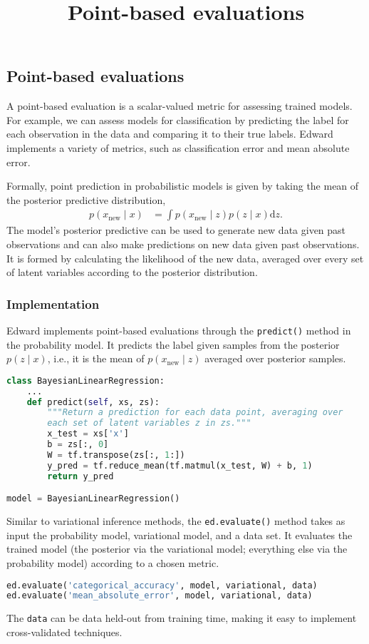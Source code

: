 \title{Point-based evaluations}

\subsection{Point-based evaluations}

A point-based evaluation is a scalar-valued metric for assessing
trained models. For example, we can assess models for classification
by predicting the label for each observation in the data and comparing
it to their true labels. Edward implements a variety of metrics, such
as classification error and mean absolute error.

Formally, point prediction in probabilistic models is given by
taking the mean of the posterior predictive distribution,
\begin{align*}
  p(x_\text{new} \mid x)
  &=
  \int
  p(x_\text{new} \mid z)
  p(z \mid x)
  \text{d} z.
\end{align*}
The model's posterior predictive can be used to generate new data
given past observations and can also make predictions on new data
given past observations.
It is formed by calculating the likelihood of the new data, averaged
over every set of latent variables according to the posterior
distribution.

\subsubsection{Implementation}

Edward implements point-based evaluations through the
\texttt{predict()} method in the probability model. It predicts the
label given samples from the posterior $p(z \mid x)$, i.e., it is the
mean of $p(x_\text{new} \mid z)$ averaged over posterior samples.
\begin{lstlisting}[language=Python]
class BayesianLinearRegression:
    ...
    def predict(self, xs, zs):
        """Return a prediction for each data point, averaging over
        each set of latent variables z in zs."""
        x_test = xs['x']
        b = zs[:, 0]
        W = tf.transpose(zs[:, 1:])
        y_pred = tf.reduce_mean(tf.matmul(x_test, W) + b, 1)
        return y_pred

model = BayesianLinearRegression()
\end{lstlisting}
Similar to variational inference methods, the
\texttt{ed.evaluate()} method takes as input the probability model,
variational model, and a data set. It evaluates the trained model (the
posterior via the variational model; everything else via the
probability model) according to a chosen metric.
\begin{lstlisting}[language=Python]
ed.evaluate('categorical_accuracy', model, variational, data)
ed.evaluate('mean_absolute_error', model, variational, data)
\end{lstlisting}
The \texttt{data} can be data held-out from training time, making it
easy to implement cross-validated techniques.

